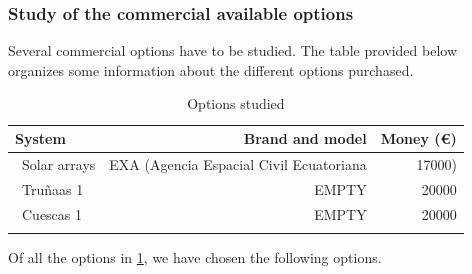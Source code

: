 \subsubsection{Study of the commercial available options}
Several commercial options have to be studied. The table provided below organizes some information about the different options purchased.

\begin{longtable}{| l | r | r | }
\hline
\rowcolor[gray]{0.80}	\textbf{System} &  \textbf{Brand and model}     & \textbf{Money (\euro)}   \\
\hline
\endfirsthead

	   ~Solar arrays & EXA (Agencia Espacial Civil Ecuatoriana & 17000) \\
	   ~Truñaas 1 & EMPTY & 20000 \\
	   ~Cuescas 1 & EMPTY & 20000 \\
	\hline

\caption{Options studied}
\label{epsoptionstable}
\end{longtable}

Of all the options in \ref{epsoptionstable}, we have chosen the following options.

